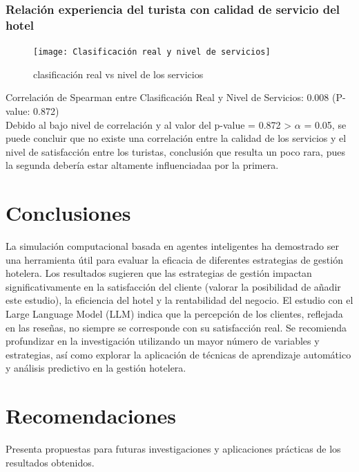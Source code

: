 \documentclass[12pt,a4paper]{article} \usepackage[spanish]{babel} \usepackage{graphicx} \usepackage{amsmath} \usepackage{amsfonts} \usepackage{amssymb} \usepackage{float} \usepackage{geometry}
\begin{document}
\subsubsection{Relación experiencia del turista con calidad de servicio del hotel} %
\begin{figure}[H] \centering \texttt{[image: Clasificación real y nivel de servicios]} \caption{clasificación real vs nivel de los servicios} \label{fig:etiqueta} \end{figure}
Correlación de Spearman entre Clasificación Real y Nivel de Servicios: 0.008 (P-value: 0.872)\\
Debido al bajo nivel de correlación y al valor del p-value = 0.872 > $\alpha$ = 0.05, se puede concluir que no existe una correlación entre la calidad de los servicios y el nivel de satisfacción entre los turistas, conclusión que resulta un poco rara, pues la segunda debería estar altamente influenciadaa por la primera.


\section{Conclusiones}

La simulación computacional basada en agentes inteligentes ha demostrado ser una herramienta útil para evaluar la eficacia de diferentes estrategias de gestión hotelera. Los resultados sugieren que las estrategias de gestión impactan significativamente en la satisfacción del cliente (valorar la posibilidad de añadir este estudio), la eficiencia del hotel y la rentabilidad del negocio. El estudio con el Large Language Model (LLM) indica que la percepción de los clientes, reflejada en las reseñas, no siempre se corresponde con su satisfacción real. Se recomienda profundizar en la investigación utilizando un mayor número de variables y estrategias, así como explorar la aplicación de técnicas de aprendizaje automático y análisis predictivo en la gestión hotelera.

\section{Recomendaciones}

Presenta propuestas para futuras investigaciones y aplicaciones prácticas de los resultados obtenidos.

\vspace{-1em} \hrulefill
\end{document}
